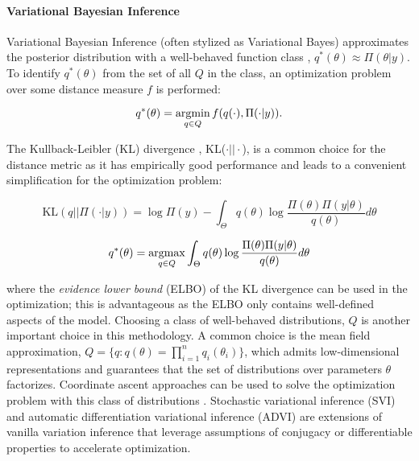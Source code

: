 \paragraph{Variational Bayesian Inference}
Variational Bayesian Inference (often stylized as Variational Bayes) approximates the posterior distribution with a well-behaved function class \autocite{wainwright2008graphical,bishop2006pattern}, $q^*(\theta) \approx \Pi(\theta | y)$. To identify $q^*(\theta)$ from the set of all $Q$ in the class, an optimization problem over some distance measure $f$ is performed:

\begin{equation}
    q^*(\theta) = \mathop\mathrm{arg min}_{q\in Q} f(q(\cdot),\Pi(\cdot|y)).
\end{equation}

The Kullback-Leibler (KL) divergence \autocite{kullback1951information}, KL($\cdot||\cdot$), is a common choice for the distance metric as it has empirically good performance \autocite{bishop2006pattern} and leads to a convenient simplification for the optimization problem:

\begin{equation}
    \text{KL}(q||\Pi(\cdot|y)) = \log \Pi(y) - \int_\Theta q(\theta) \log \frac{\Pi(\theta)\Pi(y|\theta)}{q(\theta)}d\theta
\end{equation}

\begin{equation}
    q^*(\theta) = \mathop\mathrm{arg max}_{q\in Q} \int_\Theta q(\theta) \log \frac{\Pi(\theta)\Pi(y|\theta)}{q(\theta)}d\theta
\end{equation}

\noindent where the \emph{evidence lower bound} (ELBO) of the KL divergence can be used in the optimization; this is advantageous as the ELBO only contains well-defined aspects of the model.
Choosing a class of well-behaved distributions, $Q$ is another important choice in this methodology. A common choice is the mean field approximation, $Q = \{q: q(\theta) = \prod_{i=1}^n q_i(\theta_i)\}$, which admits low-dimensional representations and guarantees that the set of distributions over parameters $\theta$ factorizes. Coordinate ascent approaches can be used to solve the optimization problem with this class of distributions \autocite{wainwright2008graphical}. Stochastic variational inference (SVI) \autocite{hoffman2013stochastic} and automatic differentiation variational inference (ADVI) \autocite{kucukelbir2017automatic} are extensions of vanilla variation inference that leverage assumptions of conjugacy or differentiable properties to accelerate optimization.

